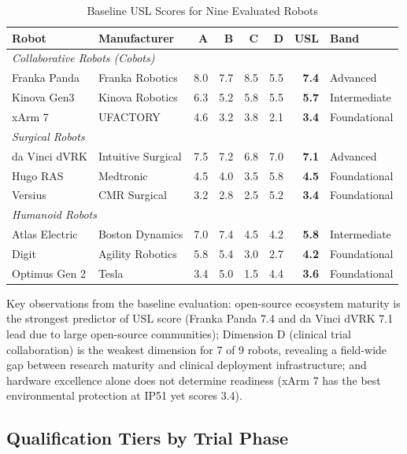 \documentclass[11pt,letterpaper]{article}
\begin{document}
\begin{table}[H]
\centering
\caption{Baseline USL Scores for Nine Evaluated Robots}
\small
\begin{tabular}{l l r r r r r l}
\toprule
\textbf{Robot} & \textbf{Manufacturer} & \textbf{A} & \textbf{B} & \textbf{C} & \textbf{D} & \textbf{USL} & \textbf{Band} \\
\midrule
\multicolumn{8}{l}{\textit{Collaborative Robots (Cobots)}} \\
Franka Panda & Franka Robotics & 8.0 & 7.7 & 8.5 & 5.5 & \textbf{7.4} & Advanced \\
Kinova Gen3 & Kinova Robotics & 6.3 & 5.2 & 5.8 & 5.5 & \textbf{5.7} & Intermediate \\
xArm 7 & UFACTORY & 4.6 & 3.2 & 3.8 & 2.1 & \textbf{3.4} & Foundational \\
\midrule
\multicolumn{8}{l}{\textit{Surgical Robots}} \\
da Vinci dVRK & Intuitive Surgical & 7.5 & 7.2 & 6.8 & 7.0 & \textbf{7.1} & Advanced \\
Hugo RAS & Medtronic & 4.5 & 4.0 & 3.5 & 5.8 & \textbf{4.5} & Foundational \\
Versius & CMR Surgical & 3.2 & 2.8 & 2.5 & 5.2 & \textbf{3.4} & Foundational \\
\midrule
\multicolumn{8}{l}{\textit{Humanoid Robots}} \\
Atlas Electric & Boston Dynamics & 7.0 & 7.4 & 4.5 & 4.2 & \textbf{5.8} & Intermediate \\
Digit & Agility Robotics & 5.8 & 5.4 & 3.0 & 2.7 & \textbf{4.2} & Foundational \\
Optimus Gen 2 & Tesla & 3.4 & 5.0 & 1.5 & 4.4 & \textbf{3.6} & Foundational \\
\bottomrule
\end{tabular}
\end{table}

Key observations from the baseline evaluation: open-source ecosystem maturity is the strongest predictor of USL score (Franka Panda 7.4 and da Vinci dVRK 7.1 lead due to large open-source communities); Dimension D (clinical trial collaboration) is the weakest dimension for 7 of 9 robots, revealing a field-wide gap between research maturity and clinical deployment infrastructure; and hardware excellence alone does not determine readiness (xArm 7 has the best environmental protection at IP51 yet scores 3.4).

\subsection{Qualification Tiers by Trial Phase}
\end{document}
